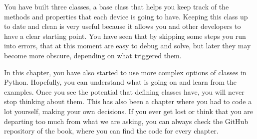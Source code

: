 You have built three classes, a base class that helps you keep track of
the methods and properties that each device is going to have. Keeping
this class up to date and clean is very useful because it allows you and
other developers to have a clear starting point. You have seen that by
skipping some steps you run into errors, that at this moment are easy to
debug and solve, but later they may become more obscure, depending on
what triggered them.

In this chapter, you have also started to use more complex options of
classes in Python. Hopefully, you can understand what is going on and
learn from the examples. Once you see the potential that defining
classes have, you will never stop thinking about them. This has also
been a chapter where you had to code a lot yourself, making your own
decisions. If you ever get lost or think that you are departing too much
from what we are asking, you can always check the GitHub repository of
the book, where you can find the code for every chapter.
